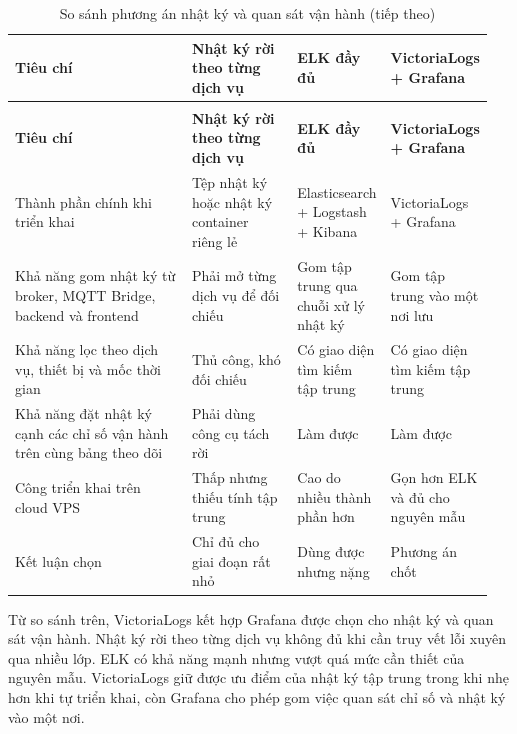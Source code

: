 \documentclass[a4paper]{extarticle}
\newcommand{\thesissettableid}[2]{%
  \renewcommand{\thetable}{#1}%
  \renewcommand{\theHtable}{#2}%
}
\begin{document}
{\thesissettableid{3.29}{condensed-bang-3-29-so-sanh-phuong-an-nhat-ky-va-quan-sat-van-hanh}
\def\LTcaptype{table}
\begin{longtable}{|L{0.371\linewidth}|L{0.222\linewidth}|L{0.188\linewidth}|L{0.17\linewidth}|}
\caption{So sánh phương án nhật ký và quan sát vận hành}\label{tab:condensed-bang-3-29-so-sanh-phuong-an-nhat-ky-va-quan-sat-van-hanh}\\
\hline
\textbf{Tiêu chí} & \textbf{Nhật ký rời theo từng dịch vụ} & \textbf{ELK đầy đủ} & \textbf{VictoriaLogs + Grafana} \\
\hline
\endfirsthead
\caption[]{So sánh phương án nhật ký và quan sát vận hành (tiếp theo)}\\
\hline
\textbf{Tiêu chí} & \textbf{Nhật ký rời theo từng dịch vụ} & \textbf{ELK đầy đủ} & \textbf{VictoriaLogs + Grafana} \\
\hline
\endhead
\endfoot
\endlastfoot
Thành phần chính khi triển khai & Tệp nhật ký hoặc nhật ký container riêng lẻ & Elasticsearch + Logstash + Kibana & VictoriaLogs + Grafana \\\hline
Khả năng gom nhật ký từ broker, MQTT Bridge, backend và frontend & Phải mở từng dịch vụ để đối chiếu & Gom tập trung qua chuỗi xử lý nhật ký & Gom tập trung vào một nơi lưu \\\hline
Khả năng lọc theo dịch vụ, thiết bị và mốc thời gian & Thủ công, khó đối chiếu & Có giao diện tìm kiếm tập trung & Có giao diện tìm kiếm tập trung \\\hline
Khả năng đặt nhật ký cạnh các chỉ số vận hành trên cùng bảng theo dõi & Phải dùng công cụ tách rời & Làm được & Làm được \\\hline
Công triển khai trên cloud VPS & Thấp nhưng thiếu tính tập trung & Cao do nhiều thành phần hơn & Gọn hơn ELK và đủ cho nguyên mẫu \\\hline
Kết luận chọn & Chỉ đủ cho giai đoạn rất nhỏ & Dùng được nhưng nặng & Phương án chốt \\\hline
\end{longtable}
}

Từ so sánh trên, VictoriaLogs kết hợp Grafana được chọn cho nhật ký và quan sát
vận hành. Nhật ký rời theo từng dịch vụ không đủ khi cần truy vết lỗi xuyên qua
nhiều lớp. ELK có khả năng mạnh nhưng vượt quá mức cần thiết của nguyên mẫu.
VictoriaLogs giữ được ưu điểm của nhật ký tập trung trong khi nhẹ hơn khi tự
triển khai, còn Grafana cho phép gom việc quan sát chỉ số và nhật ký vào một
nơi.
\end{document}
